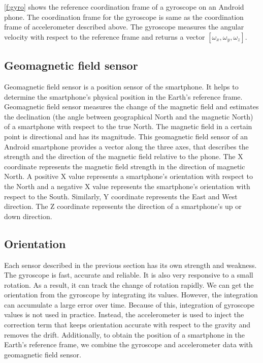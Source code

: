 \ref{f:gyro} shows the reference coordination frame of a gyroscope on an Android phone.
The coordination frame for the gyroscope is same as the coordination frame of accelerometer described above.
The gyroscope measures the angular velocity with respect to the reference frame and returns a vector $[\omega_x, \omega_y, \omega_z]$.


\subsection{Geomagnetic field sensor}
Geomagnetic field sensor is a position sensor of the smartphone.
It helps to determine the smartphone's physical position in the Earth's reference frame.
Geomagnetic field sensor measures the change of the magnetic field and estimates the declination (the angle between geographical North and the magnetic North) of a smartphone with respect to the true North. 
The magnetic field in a certain point is directional and has its magnitude.
This geomagnetic field sensor of an Android smartphone provides a vector along the three axes, that describes the strength and the direction of the magnetic field relative to the phone.
The X coordinate represents the magnetic field strength in the direction of magnetic North.
A positive X value represents a smartphone's orientation with respect to the North and a negative X value represents the smartphone's orientation with respect to the South.
Similarly, Y coordinate represents the East and West direction.
The Z coordinate represents the direction of a smartphone's up or down direction.


\subsection{Orientation}
Each sensor described in the previous section has its own strength and weakness.
The gyroscope is fast, accurate and reliable.
It is also very responsive to a small rotation.
As a result, it can track the change of rotation rapidly.
We can get the orientation from the gyroscope by integrating its values.
However, the integration can accumulate a large error over time.
Because of this, integration of gyroscope values is not used in practice. 
Instead, the accelerometer is used to inject the correction term that keeps orientation accurate with respect to the gravity and removes the drift.
Additionally, to obtain the position of a smartphone in the Earth's reference frame, we combine the gyroscope and accelerometer data with geomagnetic field sensor.

